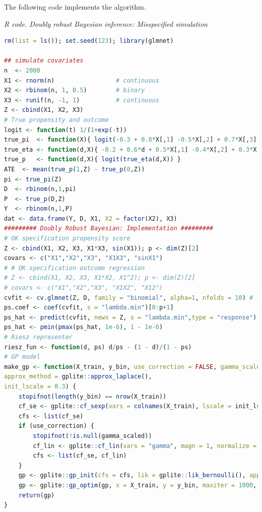 \begin{enumerate}[leftmargin=*]
The following code implements the algorithm.

\begin{tcolorbox}[enhanced,width=4.67in,center upper,
	fontupper=\large\bfseries,drop shadow southwest,sharp corners]
	\textit{R code. Doubly robust Bayesian inference: Misspecified simulation}
	\begin{VF}
		\begin{lstlisting}[language=R]
rm(list = ls()); set.seed(123); library(glmnet)

## simulate covariates
n  <- 2000
X1 <- rnorm(n)                 # continuous
X2 <- rbinom(n, 1, 0.5)        # binary
X3 <- runif(n, -1, 1)          # continuous
Z <- cbind(X1, X2, X3)
# True propensity and outcome
logit <- function(t) 1/(1+exp(-t))
true_pi  <- function(X){ logit(-0.3 + 0.8*X[,1] -0.5*X[,2] + 0.7*X[,3] + 0.7*X[,1]*X[,3] + 0.5*sin(X[,1])) }
true_eta <- function(d,X){ -0.2 + 0.6*d + 0.5*X[,1] -0.4*X[,2] + 0.3*X[,3] + 0.6*(X[,1]^2) - 0.5*X[,1]*X[,2] }
true_p   <- function(d,X){ logit(true_eta(d,X)) }
ATE  <- mean(true_p(1,Z) - true_p(0,Z))
pi <- true_pi(Z)
D  <- rbinom(n,1,pi)
P  <- true_p(D,Z)
Y  <- rbinom(n,1,P)
dat <- data.frame(Y, D, X1, X2 = factor(X2), X3)
######### Doubly Robust Bayesian: Implementation #########
# OK specification propensity score
Z <- cbind(X1, X2, X3, X1*X3, sin(X1)); p <- dim(Z)[2]
covars <- c("X1","X2","X3", "X1X3", "sinX1")
# # OK specification outcome regression
# Z <- cbind(X1, X2, X3, X1*X2, X1^2); p <- dim(Z)[2]
# covars <- c("X1","X2","X3", "X1X2", "X12")
cvfit <- cv.glmnet(Z, D, family = "binomial", alpha=1, nfolds = 10) # lasso,min
ps.coef <- coef(cvfit, s = "lambda.min")[0:p+1]
ps_hat <- predict(cvfit, newx = Z, s = "lambda.min",type = "response")
ps_hat <- pmin(pmax(ps_hat, 1e-6), 1 - 1e-6)
# Riesz representer
riesz_fun <- function(d, ps) d/ps - (1 - d)/(1 - ps)
# GP model
make_gp <- function(X_train, y_bin, use_correction = FALSE, gamma_scaled = NULL,
approx_method = gplite::approx_laplace(),
init_lscale = 0.3) {
	stopifnot(length(y_bin) == nrow(X_train))
	cf_se <- gplite::cf_sexp(vars = colnames(X_train), lscale = init_lscale, magn = 1, normalize = TRUE)
	cfs <- list(cf_se)
	if (use_correction) {
		stopifnot(!is.null(gamma_scaled))
		cf_lin <- gplite::cf_lin(vars = "gamma", magn = 1, normalize = FALSE)
		cfs <- list(cf_se, cf_lin)
	}
	gp <- gplite::gp_init(cfs = cfs, lik = gplite::lik_bernoulli(), approx = approx_method)
	gp <- gplite::gp_optim(gp, x = X_train, y = y_bin, maxiter = 1000, restarts = 3, tol = 1e-05)
	return(gp)
}
\end{lstlisting}
\end{VF}
\end{tcolorbox} 


\end{enumerate}
